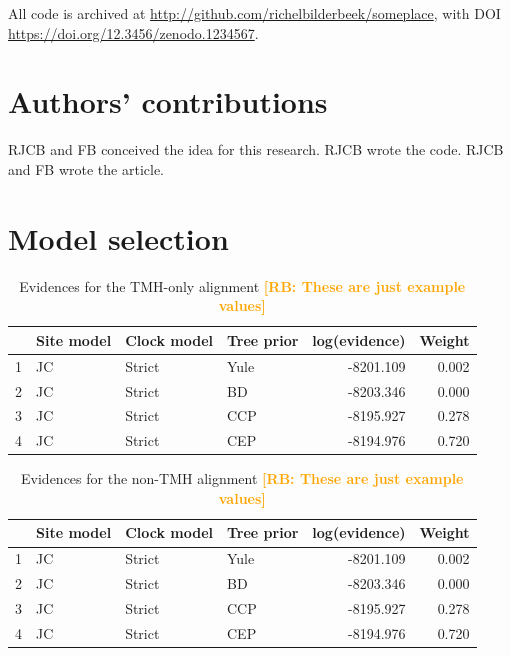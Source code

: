 \documentclass{article}
\newcommand{\richel}[1]{\textcolor{orange}{\textbf{[RB: #1]}}}
\begin{document}
All code is archived at \url{http://github.com/richelbilderbeek/someplace},
with DOI \url{https://doi.org/12.3456/zenodo.1234567}.

\section{Authors' contributions}

RJCB and FB conceived the idea for this research. 
RJCB wrote the code.
RJCB and FB wrote the article.




\appendix

\section{Model selection}

\begin{table}[ht]
\centering
\begin{tabular}{rlllrr}
  \hline
 & Site model & Clock model & Tree prior & log(evidence) & Weight \\ 
  \hline
1 & JC & Strict & Yule & -8201.109 & 0.002 \\ 
  2 & JC & Strict & BD & -8203.346 & 0.000 \\ 
  3 & JC & Strict & CCP & -8195.927 & 0.278 \\ 
  4 & JC & Strict & CEP & -8194.976 & 0.720 \\ 
   \hline
\end{tabular}
\caption{
  Evidences for the TMH-only alignment
  \richel{These are just example values}
} 
\label{tab:evidences_tmh}
\end{table}

\begin{table}[ht]
\centering
\begin{tabular}{rlllrr}
  \hline
 & Site model & Clock model & Tree prior & log(evidence) & Weight \\ 
  \hline
1 & JC & Strict & Yule & -8201.109 & 0.002 \\ 
  2 & JC & Strict & BD & -8203.346 & 0.000 \\ 
  3 & JC & Strict & CCP & -8195.927 & 0.278 \\ 
  4 & JC & Strict & CEP & -8194.976 & 0.720 \\ 
   \hline
\end{tabular}
\caption{
  Evidences for the non-TMH alignment
  \richel{These are just example values}
} 
\label{tab:evidences_non_tmh}
\end{table}
\end{document}
